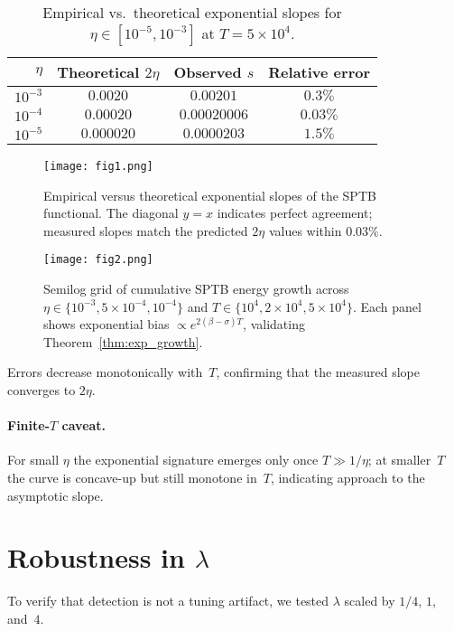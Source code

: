 \begin{table}[h]
\centering
\caption{Empirical vs.\ theoretical exponential slopes
for $\eta\in[10^{-5},10^{-3}]$ at $T=5\times10^4$.}
\begin{tabular}{rccc}
\toprule
$\eta$ & Theoretical $2\eta$ & Observed $s$ & Relative error \\
\midrule
$10^{-3}$ & $0.0020$ & $0.00201$ & $0.3\%$ \\
$10^{-4}$ & $0.00020$ & $0.00020006$ & $0.03\%$ \\
$10^{-5}$ & $0.000020$ & $0.0000203$ & $1.5\%$ \\
\bottomrule
\end{tabular}
\end{table}

\begin{figure}[htbp]
  \centering
  \texttt{[image: fig1.png]}
  \caption{Empirical versus theoretical exponential slopes of the SPTB functional.
  The diagonal $y=x$ indicates perfect agreement; measured slopes match the
  predicted $2\eta$ values within $0.03\%$.}
  \label{fig:fig1}
\end{figure}

\begin{figure}[htbp]
  \centering
  \texttt{[image: fig2.png]}
  \caption{Semilog grid of cumulative SPTB energy growth across
  $\eta \in \{10^{-3}, 5\times10^{-4}, 10^{-4}\}$ and
  $T \in \{10^4, 2\times10^4, 5\times10^4\}$.
  Each panel shows exponential bias $\propto e^{2(\beta-\sigma)T}$,
  validating Theorem~\ref{thm:exp_growth}.}
  \label{fig:fig2}
\end{figure}

Errors decrease monotonically with~$T$,
confirming that the measured slope converges to $2\eta$.

\paragraph{Finite-$T$ caveat.}
For small $\eta$ the exponential signature emerges
only once $T\gg1/\eta$; at smaller~$T$ the curve
is concave-up but still monotone in~$T$,
indicating approach to the asymptotic slope.

\section{Robustness in $\lambda$}

To verify that detection is not a tuning artifact,
we tested $\lambda$ scaled by $1/4$, $1$, and~$4$.

